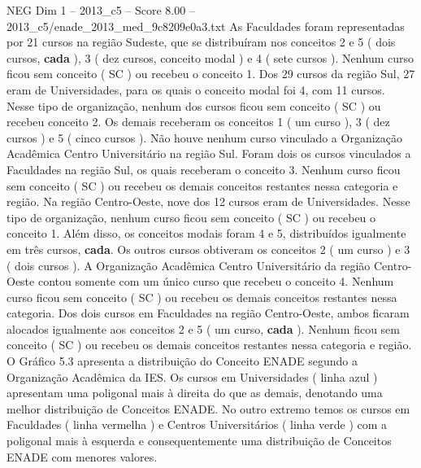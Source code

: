 \begin{textsample}{NEG Dim 1 – 2013\_c5 – Score 8.00 – 2013\_c5/enade\_2013\_med\_9c8209e0a3.txt}
As Faculdades foram representadas por 21 cursos na região Sudeste, que se distribuíram nos conceitos 2 e 5 ( dois cursos, \textbf{cada} ), 3 ( dez cursos, conceito modal ) e 4 ( sete cursos ).
Nenhum curso ficou sem conceito ( SC ) ou recebeu o conceito 1.
Dos 29 cursos da região Sul, 27 eram de Universidades, para os quais o conceito modal foi 4, com 11 cursos.
Nesse tipo de organização, nenhum dos cursos ficou sem conceito ( SC ) ou recebeu conceito 2.
Os demais receberam os conceitos 1 ( um curso ), 3 ( dez cursos ) e 5 ( cinco cursos ).
Não houve nenhum curso vinculado a Organização Acadêmica Centro Universitário na região Sul.
Foram dois os cursos vinculados a Faculdades na região Sul, os quais receberam o conceito 3.
Nenhum curso ficou sem conceito ( SC ) ou recebeu os demais conceitos restantes nessa categoria e região.
Na região Centro-Oeste, nove dos 12 cursos eram de Universidades.
Nesse tipo de organização, nenhum curso ficou sem conceito ( SC ) ou recebeu o conceito 1.
Além disso, os conceitos modais foram 4 e 5, distribuídos igualmente em três cursos, \textbf{cada}.
Os outros cursos obtiveram os conceitos 2 ( um curso ) e 3 ( dois cursos ).
A Organização Acadêmica Centro Universitário da região Centro-Oeste contou somente com um único curso que recebeu o conceito 4.
Nenhum curso ficou sem conceito ( SC ) ou recebeu os demais conceitos restantes nessa categoria.
Dos dois cursos em Faculdades na região Centro-Oeste, ambos ficaram alocados igualmente aos conceitos 2 e 5 ( um curso, \textbf{cada} ).
Nenhum ficou sem conceito ( SC ) ou recebeu os demais conceitos restantes nessa categoria e região.
O Gráfico 5.3 apresenta a distribuição do Conceito ENADE segundo a Organização Acadêmica da IES.
Os cursos em Universidades ( linha azul ) apresentam uma poligonal mais à direita do que as demais, denotando uma melhor distribuição de Conceitos ENADE.
No outro extremo temos os cursos em Faculdades ( linha vermelha ) e Centros Universitários ( linha verde ) com a poligonal mais à esquerda e consequentemente uma distribuição de Conceitos ENADE com menores valores.

\end{textsample}
